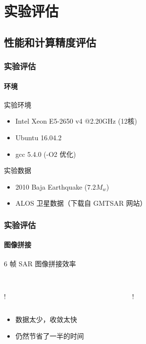 \documentclass{beamer}
\begin{document}
\section{实验评估}
\subsection{性能和计算精度评估}

\begin{frame}
    \frametitle{实验评估}
    \framesubtitle{环境}

    \begin{block}{实验环境}
        \small
        \begin{itemize}
            \setlength\itemsep{-0.1em}
            \item Intel Xeon E5-2650 v4 @2.20GHz (12核)
            \item Ubuntu 16.04.2
            \item gcc 5.4.0 (-O2 优化)
        \end{itemize}
    \end{block}
 
    \begin{block}{实验数据}
        \small
        \begin{itemize}
            \setlength\itemsep{-0.1em}
            \item 2010 Baja Earthquake ($7.2 M_w$)
            \item ALOS 卫星数据（下载自 GMTSAR 网站）
        \end{itemize}
    \end{block}
\end{frame}


\begin{frame}
    \frametitle{实验评估}
    \framesubtitle{图像拼接}

    6 帧 SAR 图像拼接效率 \\~\\
    \begin{columns}
        \begin{column}{0.5\textwidth}
            \centering
            \resizebox {\textwidth} {!} {
                
            }
        \end{column}
        \begin{column}{0.5\textwidth}
            \centering
            \resizebox {\textwidth} {!} {
                
            }
        \end{column}
    \end{columns}

    \begin{itemize}
        \small
        \setlength\itemsep{-0.1em}
        \item 数据太少，收敛太快
        \item 仍然节省了一半的时间
    \end{itemize}
\end{frame}
\end{document}
